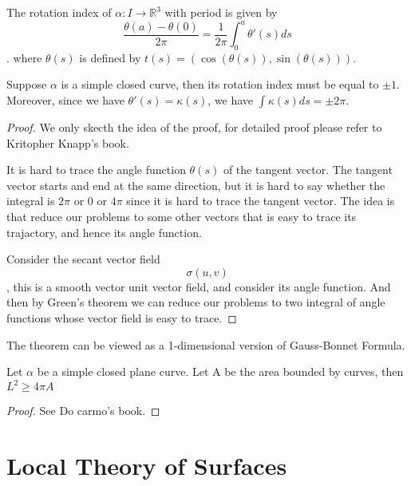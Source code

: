 \documentclass{article}
\begin{document}
\begin{definition}
    The rotation index of $\alpha:I\to \mathbb{R}^3$ with period is given by \[\frac{\theta(a)-\theta(0)}{2\pi}=\frac{1}{2\pi}\int_0^a\theta'(s)ds\]. where $\theta(s)$ is defined by $t(s)=(\cos(\theta(s)),\sin(\theta(s)))$.
\end{definition}

\begin{theorem}
Suppose $\alpha$ is a simple closed curve, then its rotation index must be equal to $\pm 1$. Moreover, since we have $\theta'(s)=\kappa(s)$, we have $\int\kappa(s)ds=\pm2\pi$.    
\end{theorem}
\begin{proof}
    We only skecth the idea of the proof, for detailed proof please refer to Kritopher Knapp's book.

     It is hard to trace the angle function $\theta(s)$ of the tangent vector. The tangent vector starts and end at the same direction, but it is hard to say whether the integral is $2\pi $ or $0$ or $4\pi$ since it is hard to trace the tangent vector. The idea is that reduce our problems to some other vectors that is easy to trace its trajactory, and hence its angle function.

     Consider the secant vector field \[\sigma(u,v)\], this is a smooth vector unit vector field, and consider its angle function. And then by Green's theorem we can reduce our problems to two integral of angle functions whose vector field is easy to trace.
\end{proof}

\begin{remark}
    The theorem can be viewed as a 1-dimensional version of Gauss-Bonnet Formula.
\end{remark}

\begin{theorem}
    Let $\alpha$ be a simple closed plane curve. Let A be the area bounded by curves, then $L^2\geq 4\pi A$
\end{theorem}
\begin{proof}
    See Do carmo's book.
\end{proof}
\newpage
\section{Local Theory of Surfaces}
\end{document}
